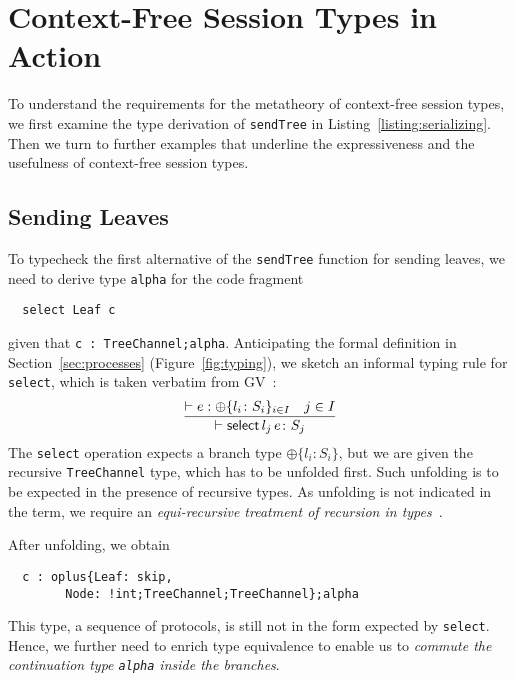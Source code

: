 
\section{Context-Free Session Types in Action}
\label{sec:context-free-session}

To understand the requirements for the metatheory of
context-free session types, we first examine the type derivation of
\lstinline|sendTree| in Listing~\ref{listing:serializing}. Then we
turn to further examples that underline the expressiveness and the
usefulness of context-free session types.

\subsection{Sending Leaves}
\label{sec:sending-leaves}


To typecheck the first alternative of the \lstinline|sendTree|
function for sending leaves, we need to derive type \lstinline|alpha| for the code
fragment
\begin{lstlisting}
  select Leaf c
\end{lstlisting}
given that \lstinline{c : TreeChannel;alpha}. Anticipating the formal
definition in Section~\ref{sec:processes} (Figure~\ref{fig:typing}),
we sketch an informal typing rule for \lstinline|select|, which is
taken verbatim from GV~\cite{DBLP:journals/jfp/GayV10}:
\begin{equation}\label{eq:2}
    \frac{
      \vdash e : \oplus\{l_i\colon S_i\}_{i\in I}
      \quad
      j\in I
    }{
      \vdash \mathsf{select}{\,{l_j}\,{e}} \colon S_j
    }
\end{equation}
 The \lstinline|select|
operation expects a branch type $\oplus\{l_i\colon S_i\}$, but we are given the recursive
\lstinline|TreeChannel| type, which has to be unfolded first. Such
unfolding is to be expected in the 
presence of recursive types. As unfolding is not indicated in the term,
we require an \emph{equi-recursive treatment of recursion in types}~\cite{Pierce2002-tpl}.


After unfolding, we obtain
\begin{lstlisting}
  c : oplus{Leaf: skip,
        Node: !int;TreeChannel;TreeChannel};alpha
\end{lstlisting}
This type, a sequence of protocols, is still not in the form expected
by \lstinline|select|. Hence, we further
need to enrich type equivalence to enable us to \emph{commute the
continuation type \lstinline|alpha| inside the branches}.

